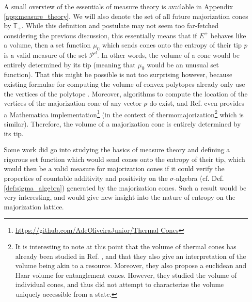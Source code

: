 A small overview of the essentials of measure theory is available in Appendix \ref{app:measure_theory}. We will also denote the set of all future majorization cones by $\mathbb{T}_+$. While this definition and postulate may not seem too far-fetched considering the previous discussion, this essentially means that if $E^+$ behaves like a volume, then a set function $\mu_0$ which sends cones onto the entropy of their tip $p$ is a valid measure of the set $\mathcal{P}^d$. In other words, the volume of a cone would be entirely determined by its tip (meaning that $\mu_0$ would be an unusual set function). That this might be possible is not too surprising however, because existing formulae for computing the volume of convex polytopes already only use the vertices of the polytope \cite{braden_surveyors_1986}. Moreover, algorithms to compute the location of the vertices of the majorization cone of any vector $p$ do exist, and Ref. \cite{junior_geometric_2022} even provides a Mathematica implementation\footnote{\url{https://github.com/AdeOliveiraJunior/Thermal-Cones}} (in the context of thermomajorization\footnote{It is interesting to note at this point that the volume of thermal cones has already been studied in Ref. \cite{junior_geometric_2022}, and that they also give an interpretation of the volume being akin to a resource. Moreover, they also propose a euclidean and Haar volume for entanglement cones. However, they studied the volume of individual cones, and thus did not attempt to characterize the volume uniquely accessible from a state.} which is similar). Therefore, the volume of a majorization cone is entirely determined by its tip.

Some work did go into studying the basics of measure theory and defining a rigorous set function which would send cones onto the entropy of their tip, which would then be a valid measure for majorization cones if it could verify the properties of countable additivity and positivity on the $\sigma$-algebra (cf. Def. \ref{def:sigma_algebra}) generated by the majorization cones. Such a result would be very interesting, and would give new insight into the nature of entropy on the majorization lattice.

